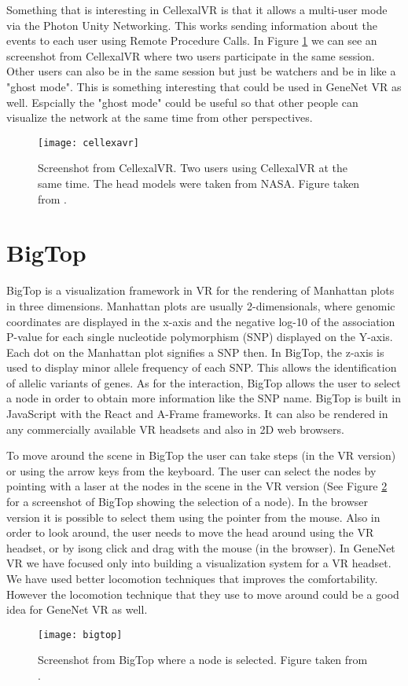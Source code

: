 Something that is interesting in CellexalVR is that it allows a multi-user mode via the Photon Unity Networking. This works sending information about the events to each user using Remote Procedure Calls. In Figure \ref{fig:cellexavr} we can see an screenshot from CellexalVR where two users participate in the same session. Other users can also be in the same session but just be watchers and be in like a "ghost mode". This is something interesting that could be used in GeneNet VR as well. Espcially the "ghost mode" could be useful so that other people can visualize the network at the same time from other perspectives.

\begin{figure}[h!]
    \centering%
    \texttt{[image: cellexavr]}
    \caption{Screenshot from CellexalVR. Two users using CellexalVR at the same time. The head models were taken from NASA. Figure taken from \cite{cellexalvr}.}
    \label{fig:cellexavr}
\end{figure}%

\section{BigTop}
BigTop is a visualization framework in VR for the rendering of Manhattan plots in three dimensions\cite{bigtop}. Manhattan plots are usually 2-dimensionals, where genomic coordinates are displayed in the x-axis and the negative log-10 of the association P-value for each single nucleotide polymorphism (SNP) displayed on the Y-axis. Each dot on the Manhattan plot signifies a SNP then. In BigTop, the z-axis is used to display minor allele frequency of each SNP. This allows the identification of allelic variants of genes. As for the interaction, BigTop allows the user to select a node in order to obtain more information like the SNP name. BigTop is built in JavaScript with the React and A-Frame frameworks. It can also be rendered in any commercially available VR headsets and also in 2D web browsers.

To move around the scene in BigTop the user can take steps (in the VR version) or using the arrow keys from the keyboard. The user can select the nodes by pointing with a laser at the nodes in the scene in the VR version (See Figure \ref{fig:bigtop} for a screenshot of BigTop showing the selection of a node). In the browser version it is possible to select them using the pointer from the mouse. Also in order to look around, the user needs to move the head around using the VR headset, or by isong click and drag with the mouse (in the browser). In GeneNet VR we have focused only into building a visualization system for a VR headset. We have used better locomotion techniques that improves the comfortability. However the locomotion technique that they use to move around could be a good idea for GeneNet VR as well.

\begin{figure}[h!]
    \centering%
    \texttt{[image: bigtop]}
    \caption{Screenshot from BigTop where a node is selected. Figure taken from \cite{bigtop}.}
    \label{fig:bigtop}
\end{figure}%
